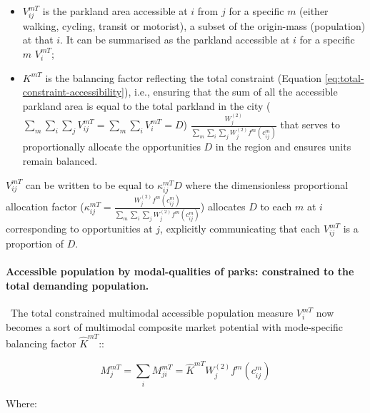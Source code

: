 \documentclass[
11pt, %
oneside, %
english, %
singlespacing, %
]{macthesis} %
\def\tightlist{}
\begin{document}
\begin{itemize}
\tightlist
\item
  \(V^{mT}_{ij}\) is the parkland area accessible at \(i\) from \(j\) for a specific \(m\) (either walking, cycling, transit or motorist), a subset of the origin-mass (population) at that \(i\). It can be summarised as the parkland accessible at \(i\) for a specific \(m\) \(V^{mT}_{i}\);
\item
  \(K^{mT}\) is the balancing factor reflecting the total constraint (Equation \ref{eq:total-constraint-accessibility}), i.e., ensuring that the sum of all the accessible parkland area is equal to the total parkland in the city (\(\sum_m\sum_i\sum_j V^{mT}_{ij} = \sum_m \sum_i V^{mT}_{i} = D\)) \(\frac{W^{(2)}_j}{\sum_m\sum_i\sum_j W^{(2)}_jf^m(c^m_{ij})}\) that serves to proportionally allocate the opportunities \(D\) in the region and ensures units remain balanced.
\end{itemize}

\(V_{ij}^{mT}\) can be written to be equal to \(\kappa_{ij}^{mT} D\) where the dimensionless proportional allocation factor (\(\kappa_{ij}^{mT} = \frac{W_j^{(2)} f^m(c^m_{ij})}{\sum_m\sum_i\sum_j W^{(2)}_jf^m(c^m_{ij})}\)) allocates \(D\) to each \(m\) at \(i\) corresponding to opportunities at \(j\), explicitly communicating that each \(V_{ij}^{mT}\) is a proportion of \(D\).

\paragraph{Accessible population by modal-qualities of parks: constrained to the total demanding population.}\label{accessible-population-by-modal-qualities-of-parks-constrained-to-the-total-demanding-population.}

~The total constrained multimodal accessible population measure \(V^{mT}_{i}\) now becomes a sort of multimodal composite market potential with mode-specific balancing factor \(\hat K^{mT}\)::

\begin{equation}
\label{eq:total-constrained-multimodal-market-park}
M^{mT}_{j} = \sum_i M^{mT}_{ji} = \hat K^{mT} W_j^{(2)} f^m(c^m_{ij})
\end{equation} 

Where:
\end{document}
